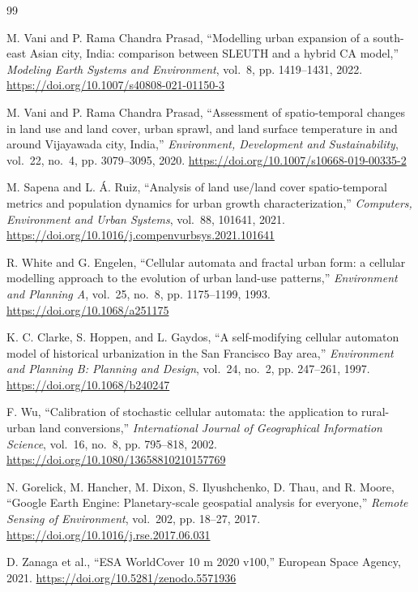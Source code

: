 \documentclass[conference]{IEEEtran}
\begin{document}
\begin{thebibliography}{99}

M. Vani and P. Rama Chandra Prasad, ``Modelling urban expansion of a south-east Asian city, India: comparison between SLEUTH and a hybrid CA model,'' \textit{Modeling Earth Systems and Environment}, vol.~8, pp. 1419--1431, 2022.
\url{https://doi.org/10.1007/s40808-021-01150-3}

M. Vani and P. Rama Chandra Prasad, ``Assessment of spatio-temporal changes in land use and land cover, urban sprawl, and land surface temperature in and around Vijayawada city, India,'' \textit{Environment, Development and Sustainability}, vol.~22, no.~4, pp. 3079--3095, 2020.
\url{https://doi.org/10.1007/s10668-019-00335-2}

M. Sapena and L. \'{A}. Ruiz, ``Analysis of land use/land cover spatio-temporal metrics and population dynamics for urban growth characterization,'' \textit{Computers, Environment and Urban Systems}, vol.~88, 101641, 2021.
\url{https://doi.org/10.1016/j.compenvurbsys.2021.101641}

R. White and G. Engelen, ``Cellular automata and fractal urban form: a cellular modelling approach to the evolution of urban land-use patterns,'' \textit{Environment and Planning A}, vol.~25, no.~8, pp. 1175--1199, 1993.
\url{https://doi.org/10.1068/a251175}

K. C. Clarke, S. Hoppen, and L. Gaydos, ``A self-modifying cellular automaton model of historical urbanization in the San Francisco Bay area,'' \textit{Environment and Planning B: Planning and Design}, vol.~24, no.~2, pp. 247--261, 1997.
\url{https://doi.org/10.1068/b240247}

F. Wu, ``Calibration of stochastic cellular automata: the application to rural-urban land conversions,'' \textit{International Journal of Geographical Information Science}, vol.~16, no.~8, pp. 795--818, 2002.
\url{https://doi.org/10.1080/13658810210157769}

N. Gorelick, M. Hancher, M. Dixon, S. Ilyushchenko, D. Thau, and R. Moore, ``Google Earth Engine: Planetary-scale geospatial analysis for everyone,'' \textit{Remote Sensing of Environment}, vol.~202, pp. 18--27, 2017.
\url{https://doi.org/10.1016/j.rse.2017.06.031}

D. Zanaga et al., ``ESA WorldCover 10 m 2020 v100,'' European Space Agency, 2021.
\url{https://doi.org/10.5281/zenodo.5571936}


\end{thebibliography}
\end{document}
